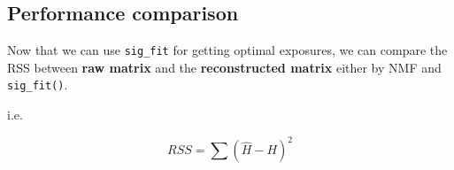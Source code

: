 \documentclass[
  12pt,
  a4paper,
  twoside]{book}
\newenvironment{Shaded}{\begin{snugshade}}{\end{snugshade}}
\newcommand{\ControlFlowTok}[1]{\textcolor[rgb]{0.13,0.29,0.53}{\textbf{#1}}}
\newcommand{\DecValTok}[1]{\textcolor[rgb]{0.00,0.00,0.81}{#1}}
\newcommand{\DocumentationTok}[1]{\textcolor[rgb]{0.56,0.35,0.01}{\textbf{\textit{#1}}}}
\newcommand{\FunctionTok}[1]{\textcolor[rgb]{0.00,0.00,0.00}{#1}}
\newcommand{\NormalTok}[1]{#1}
\newcommand{\SpecialCharTok}[1]{\textcolor[rgb]{0.00,0.00,0.00}{#1}}
\begin{document}
\hypertarget{performance-comparison}{%
\subsection{Performance comparison}\label{performance-comparison}}

Now that we can use \texttt{sig\_fit} for getting optimal exposures, we can compare the RSS between \textbf{raw matrix} and the \textbf{reconstructed matrix} either by NMF and \texttt{sig\_fit()}.

i.e.~

\[
RSS = \sum(\hat H - H)^2
\]

\begin{Shaded}
\end{Shaded}
\end{document}
